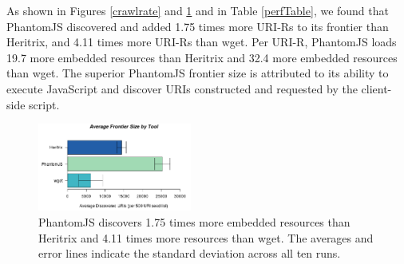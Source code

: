 \documentclass{ipres_proc_article-sp}
\begin{document}
As shown in Figures \ref{crawlrate} and \ref{frontiersize} and in Table \ref{perfTable}, we found that PhantomJS discovered and added 
1.75 times more URI-Rs to its frontier than Heritrix, and 4.11 times more URI-Rs than wget. Per URI-R, PhantomJS loads 19.7 more embedded resources than Heritrix and 32.4 more embedded resources than wget. The superior PhantomJS frontier size is attributed to its ability to execute JavaScript and discover URIs constructed and requested by the client-side script.

\begin{figure}
  \begin{center}
    \includegraphics[width=0.45\textwidth]{./imgs/sizeBarStats.png}
  \end{center}
  \caption{PhantomJS discovers 1.75 times more embedded resources than Heritrix and 4.11 times more resources than wget. The averages and error lines indicate the standard deviation across all ten runs.}
  \label{frontiersize}
\end{figure}


\end{document}
